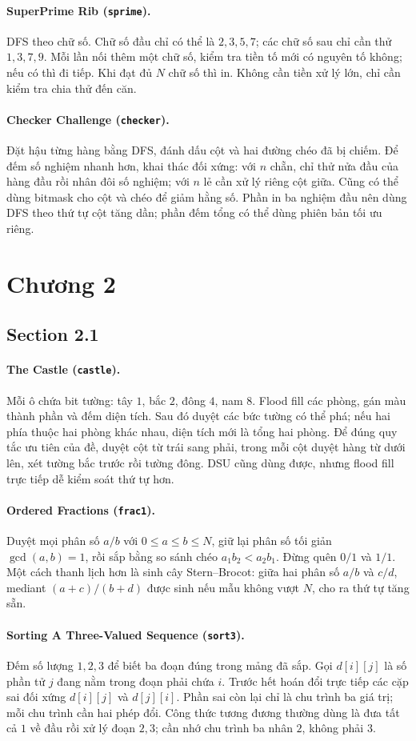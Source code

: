 \documentclass[11pt]{article}
\newcommand{\problem}[2]{\paragraph{#1 (\texttt{#2}).}}
\begin{document}
\problem{SuperPrime Rib}{sprime}
DFS theo chữ số. Chữ số đầu chỉ có thể là \(2,3,5,7\); các chữ số sau chỉ cần thử \(1,3,7,9\). Mỗi lần nối thêm một chữ số, kiểm tra tiền tố mới có nguyên tố không; nếu có thì đi tiếp. Khi đạt đủ \(N\) chữ số thì in. Không cần tiền xử lý lớn, chỉ cần kiểm tra chia thử đến căn.

\problem{Checker Challenge}{checker}
Đặt hậu từng hàng bằng DFS, đánh dấu cột và hai đường chéo đã bị chiếm. Để đếm số nghiệm nhanh hơn, khai thác đối xứng: với \(n\) chẵn, chỉ thử nửa đầu của hàng đầu rồi nhân đôi số nghiệm; với \(n\) lẻ cần xử lý riêng cột giữa. Cũng có thể dùng bitmask cho cột và chéo để giảm hằng số. Phần in ba nghiệm đầu nên dùng DFS theo thứ tự cột tăng dần; phần đếm tổng có thể dùng phiên bản tối ưu riêng.

\section*{Chương 2}

\subsection*{Section 2.1}

\problem{The Castle}{castle}
Mỗi ô chứa bit tường: tây \(1\), bắc \(2\), đông \(4\), nam \(8\). Flood fill các phòng, gán màu thành phần và đếm diện tích. Sau đó duyệt các bức tường có thể phá; nếu hai phía thuộc hai phòng khác nhau, diện tích mới là tổng hai phòng. Để đúng quy tắc ưu tiên của đề, duyệt cột từ trái sang phải, trong mỗi cột duyệt hàng từ dưới lên, xét tường bắc trước rồi tường đông. DSU cũng dùng được, nhưng flood fill trực tiếp dễ kiểm soát thứ tự hơn.

\problem{Ordered Fractions}{frac1}
Duyệt mọi phân số \(a/b\) với \(0\le a\le b\le N\), giữ lại phân số tối giản \(\gcd(a,b)=1\), rồi sắp bằng so sánh chéo \(a_1b_2<a_2b_1\). Đừng quên \(0/1\) và \(1/1\). Một cách thanh lịch hơn là sinh cây Stern--Brocot: giữa hai phân số \(a/b\) và \(c/d\), mediant \((a+c)/(b+d)\) được sinh nếu mẫu không vượt \(N\), cho ra thứ tự tăng sẵn.

\problem{Sorting A Three-Valued Sequence}{sort3}
Đếm số lượng \(1,2,3\) để biết ba đoạn đúng trong mảng đã sắp. Gọi \(d[i][j]\) là số phần tử \(j\) đang nằm trong đoạn phải chứa \(i\). Trước hết hoán đổi trực tiếp các cặp sai đối xứng \(d[i][j]\) và \(d[j][i]\). Phần sai còn lại chỉ là chu trình ba giá trị; mỗi chu trình cần hai phép đổi. Công thức tương đương thường dùng là đưa tất cả \(1\) về đầu rồi xử lý đoạn \(2,3\); cần nhớ chu trình ba nhân \(2\), không phải \(3\).
\end{document}
